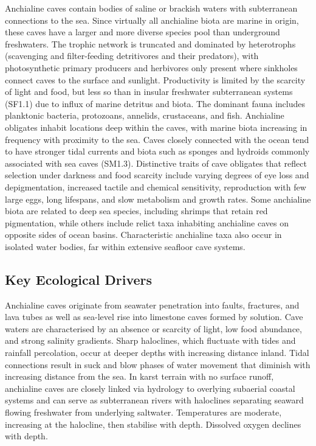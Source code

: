 \documentclass[
  letterpaper,
  DIV=11,
  numbers=noendperiod]{scrartcl}
\begin{document}
Anchialine caves contain bodies of saline or brackish waters with
subterranean connections to the sea. Since virtually all anchialine
biota are marine in origin, these caves have a larger and more diverse
species pool than underground freshwaters. The trophic network is
truncated and dominated by heterotrophs (scavenging and filter-feeding
detritivores and their predators), with photosynthetic primary producers
and herbivores only present where sinkholes connect caves to the surface
and sunlight. Productivity is limited by the scarcity of light and food,
but less so than in insular freshwater subterranean systems (SF1.1) due
to influx of marine detritus and biota. The dominant fauna includes
planktonic bacteria, protozoans, annelids, crustaceans, and fish.
Anchialine obligates inhabit locations deep within the caves, with
marine biota increasing in frequency with proximity to the sea. Caves
closely connected with the ocean tend to have stronger tidal currents
and biota such as sponges and hydroids commonly associated with sea
caves (SM1.3). Distinctive traits of cave obligates that reflect
selection under darkness and food scarcity include varying degrees of
eye loss and depigmentation, increased tactile and chemical sensitivity,
reproduction with few large eggs, long lifespans, and slow metabolism
and growth rates. Some anchialine biota are related to deep sea species,
including shrimps that retain red pigmentation, while others include
relict taxa inhabiting anchialine caves on opposite sides of ocean
basins. Characteristic anchialine taxa also occur in isolated water
bodies, far within extensive seafloor cave systems.

\subsection{Key Ecological Drivers}\label{key-ecological-drivers-66}

Anchialine caves originate from seawater penetration into faults,
fractures, and lava tubes as well as sea-level rise into limestone caves
formed by solution. Cave waters are characterised by an absence or
scarcity of light, low food abundance, and strong salinity gradients.
Sharp haloclines, which fluctuate with tides and rainfall percolation,
occur at deeper depths with increasing distance inland. Tidal
connections result in suck and blow phases of water movement that
diminish with increasing distance from the sea. In karst terrain with no
surface runoff, anchialine caves are closely linked via hydrology to
overlying subaerial coastal systems and can serve as subterranean rivers
with haloclines separating seaward flowing freshwater from underlying
saltwater. Temperatures are moderate, increasing at the halocline, then
stabilise with depth. Dissolved oxygen declines with depth.
\end{document}
